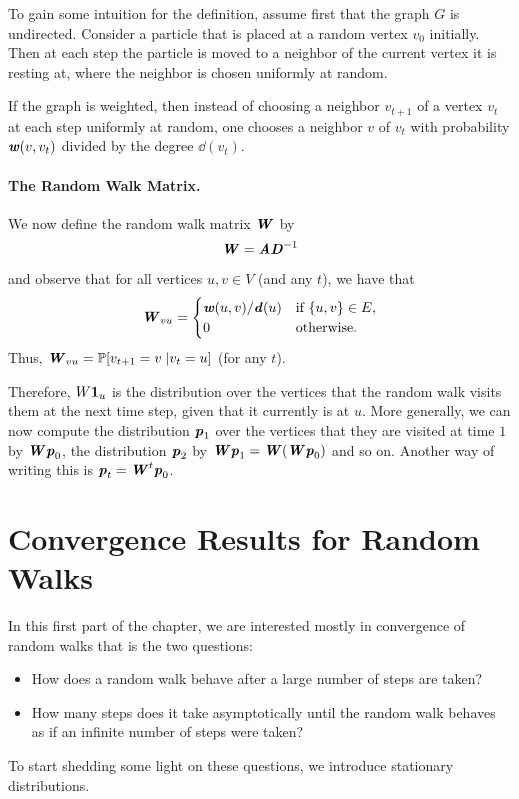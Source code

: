 To gain some intuition for the definition,  assume first that the graph $G$ is undirected. Consider a {\color{red}particle} that is placed at a random vertex $v_0$ initially. Then at each step the particle is moved to a neighbor of the current vertex it is resting at, where the neighbor is chosen uniformly at random. 

If the graph is weighted, then instead of choosing a neighbor $v_{t+1}$ of a vertex $v_t$ at each step uniformly at random, one chooses a neighbor $v$ of $v_t$ with probability $\boldsymbol{\mathit{w}}(v,v_t)$ divided by the degree $\dd(v_t)$.

\paragraph{The Random Walk Matrix.} We now define the random walk matrix $\boldsymbol{\mathit{W}}$ by
\[
    \boldsymbol{\mathit{W}} = \boldsymbol{\mathit{A}} \boldsymbol{\mathit{D}}^{-1}
\]
and observe that for all vertices $u,v \in V$ (and any $t$), we have that 
\[
\boldsymbol{\mathit{W}}_{vu} = \begin{cases}
    \boldsymbol{\mathit{w}}(u,v)/\boldsymbol{\mathit{d}}(u) & \text{if } \{u,v\} \in E,\\
    0 & \text{otherwise}.
\end{cases}
\]
Thus, $\boldsymbol{\mathit{W}}_{vu} = \mathbb{P}[v_{t+1} = v \; | v_t = u]$ (for any $t$). 

Therefore, $W \boldsymbol{1}_u$ is the distribution over the vertices that the random walk visits them at the next time step, given that it currently is at $u$. More generally, we can now compute the distribution $\boldsymbol{\mathit{p}}_1$ over the vertices that they are visited at time $1$ by $\boldsymbol{\mathit{W}} \boldsymbol{\mathit{p}}_0$, the distribution $\boldsymbol{\mathit{p}}_2$ by $\boldsymbol{\mathit{W}} \boldsymbol{\mathit{p}}_1 = \boldsymbol{\mathit{W}} ( \boldsymbol{\mathit{W}} \boldsymbol{\mathit{p}}_0)$ and so on. Another way of writing this is $\boldsymbol{\mathit{p}}_t = \boldsymbol{\mathit{W}}^t \boldsymbol{\mathit{p}}_{0}$.

\section{Convergence Results for Random Walks}

In this first part of the chapter, we are interested mostly in convergence of random walks that is the two questions:
\begin{itemize}
	\item How does a random walk behave after a large number of steps are taken? 
	\item How many steps does it take asymptotically until the random walk behaves as if an infinite number of steps were taken?
\end{itemize}

To start shedding some light on these questions, we introduce stationary distributions.

